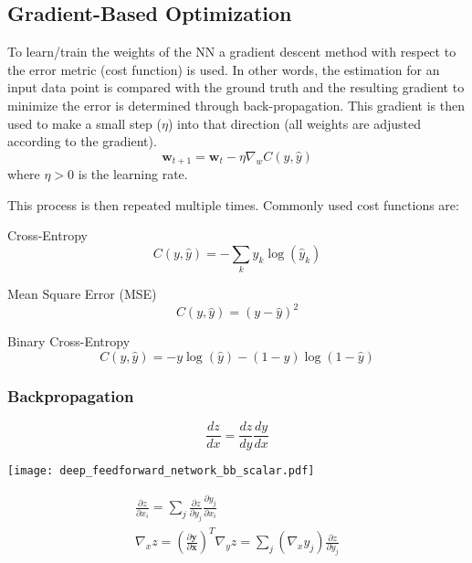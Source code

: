 \renewcommand{\arraystretch}{1}
\setlength\tabcolsep{\oldtabcolsep}

\subsection{Gradient-Based Optimization}

To learn/train the weights of the NN a gradient descent method with respect to the error metric (cost function) is used. In other words, the estimation for an input data point is compared with the ground truth and the resulting gradient to minimize the error is determined through back-propagation. This gradient is then used to make a small step ($\eta$) into that direction (all weights are adjusted according to the gradient).
\begin{equation*}
    \mathbf{w}_{t+1} = \mathbf{w}_t - \eta \nabla_w C(y,\hat{y})
\end{equation*}
where $\eta > 0$ is the learning rate.

This process is then repeated multiple times.
\newpar{}
Commonly used cost functions are:

Cross-Entropy
\begin{equation*}
    C(y,\hat{y}) = - \sum_{k}y_k\log(\hat{y}_k)
\end{equation*}

Mean Square Error (MSE)
\begin{equation*}
    C(y,\hat{y}) = {(y - \hat{y})}^2
\end{equation*}

Binary Cross-Entropy
\begin{equation*}
    C(y,\hat{y}) = -y\log(\hat{y})-(1-y)\log(1-\hat{y})
\end{equation*}

\subsubsection{Backpropagation}

\begin{equation*}
    \frac{dz}{dx} = \frac{dz}{dy}\frac{dy}{dx}
\end{equation*}

\begin{center}
    \texttt{[image: deep\_feedforward\_network\_bb\_scalar.pdf]}
\end{center}

\begin{gather*}
    \frac{\partial z}{\partial x_i} = \sum_{j}\frac{\partial z}{\partial y_j}\frac{\partial y_j}{\partial x_i} \\
    \nabla_x z = \left(\frac{\partial \mathbf{y}}{\partial \mathbf{x}}\right)^T \nabla_y z = \sum_{j}(\nabla_x y_j)\frac{\partial z}{\partial y_j}
\end{gather*}


